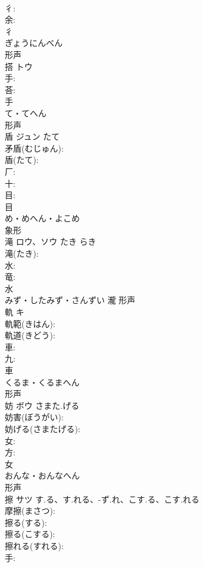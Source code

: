 \documentclass[8pt]{extreport}
\begin{document}
\begin{CJK}{UTF8}{min}
\\	彳: 
\\	余: 
\\	彳	
\\	ぎょうにんべん	
\\	形声 
\\	搭	トウ			
\\	手: 
\\	荅: 
\\	手	
\\	て・てへん	
\\	形声 
\\	盾	ジュン	たて		
\\	矛盾(むじゅん): 
\\	盾(たて): 
\\	厂: 
\\	十: 
\\	目: 
\\	目	
\\	め・めへん・よこめ	
\\	象形 
\\	滝	ロウ、ソウ	たき	らき	
\\	滝(たき): 
\\	水: 
\\	竜: 
\\	水	
\\	みず・したみず・さんずい	瀧	形声 
\\	軌	キ			
\\	軌範(きはん): 
\\	軌道(きどう): 
\\	車: 
\\	九: 
\\	車	
\\	くるま・くるまへん	
\\	形声 
\\	妨	ボウ	さまた.げる		
\\	妨害(ぼうがい): 
\\	妨げる(さまたげる): 
\\	女: 
\\	方: 
\\	女	
\\	おんな・おんなへん	
\\	形声 
\\	擦	サツ	す.る、す.れる、-ず.れ、こす.る、こす.れる		
\\	摩擦(まさつ): 
\\	擦る(する): 
\\	擦る(こする): 
\\	擦れる(すれる): 
\\	手: 

\end{CJK}
\end{document}
